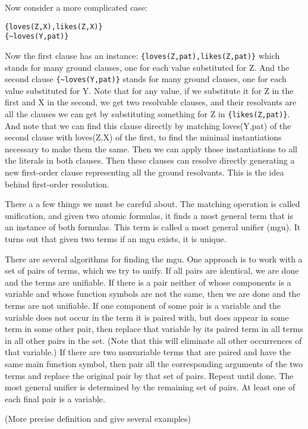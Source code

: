 Now consider a more complicated case:
\begin{verbatim}
{loves(Z,X),likes(Z,X)}
{~loves(Y,pat)}
\end{verbatim}
Now the first clause has an instance:
\verb|{loves(Z,pat),likes(Z,pat)}| which stands for many
ground clauses, one for each value substituted for Z.  And the second
clause \verb|{~loves(Y,pat)}| stands for many ground clauses, one
for each value substituted for Y.  Note that for any value, if we
substitute it for Z in the first and X in the second, we get two
resolvable clauses, and their resolvants are all the clauses we can
get by substituting something for Z in \verb|{likes(Z,pat)}|.  And
note that we can find this clause directly by matching loves(Y,pat)
of the second clause with loves(Z,X) of the first, to find the minimal
instantiations necessary to make them the same.  Then we can apply
those instantiations to all the literals in both clauses.  Then these
clauses can resolve directly generating a new first-order clause
representing all the ground resolvants.  This is the idea behind
first-order resolution.

There a a few things we must be careful about.  The matching operation
is called unification, and given two atomic formulas, it finds a most
general term that is an instance of both formulas.  This term is
called a most general unifier (mgu).  It turns out that given two
terms if an mgu exists, it is unique.   

There are several algorithms for finding the mgu.  One approach is to
work with a set of pairs of terms, which we try to unify.  If all
pairs are identical, we are done and the terms are unifiable.  If
there is a pair neither of whose components is a variable and whose
function symbols are not the same, then we are done and the terms are
not unifiable.  If one component of some pair is a variable and the
variable does not occur in the term it is paired with, but does appear
in some term in some other pair, then replace that variable by its
paired term in all terms in all other pairs in the set.  (Note that
this will eliminate all other occurrences of that variable.)  If there
are two nonvariable terms that are paired and have the same main
function symbol, then pair all the corresponding arguments of the two
terms and replace the original pair by that set of pairs.  Repeat
until done.  The most general unifier is determined by the remaining
set of pairs.  At least one of each final pair is a variable.

(More precise definition and give several examples)


